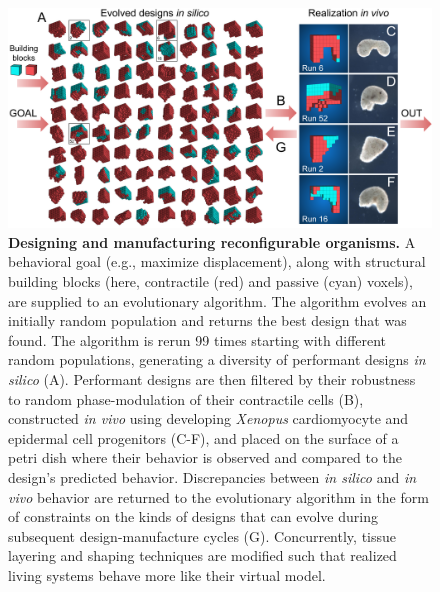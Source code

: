 \begin{figure}[t]
\centering
\includegraphics[width=\linewidth]{Chapter07/img/Fig1}
\caption{\textbf{Designing and manufacturing reconfigurable organisms.} A behavioral goal (e.g., maximize displacement), along with structural building blocks (here, contractile (red) and passive (cyan) voxels), are supplied to an evolutionary algorithm. The algorithm evolves an initially random population and returns the best design that was found. The algorithm is rerun 99 times starting with different random populations, generating a diversity of performant designs \textit{in silico} (A). Performant designs are then filtered by their robustness to random phase-modulation of their contractile cells (B), constructed \textit{in vivo} using developing \textit{Xenopus} cardiomyocyte and epidermal cell progenitors (C-F), and placed on the surface of a petri dish where their behavior is observed and compared to the design's predicted behavior. Discrepancies between \textit{in silico} and \textit{in vivo} behavior are returned to the evolutionary algorithm in the form of constraints on the kinds of designs that can evolve during subsequent design-manufacture cycles (G). Concurrently, tissue layering and shaping techniques are modified such that realized living systems behave more like their virtual model.
}
\end{figure}


